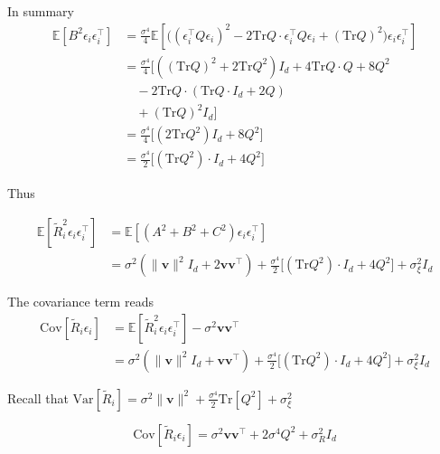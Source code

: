     
    In summary
    \begin{align*}
    \mathbb{E}[B^{2}\epsilon_{i}\epsilon_{i}^{\top}] & =\frac{\sigma^{4}}{4}\mathbb{E}[\Big((\epsilon_{i}^{\top}Q\epsilon_{i})^{2}-2\mathrm{Tr}Q\cdot\epsilon_{i}^{\top}Q\epsilon_{i}+(\mathrm{Tr}Q)^{2}\Big)\epsilon_{i}\epsilon_{i}^{\top}]\\
     & =\frac{\sigma^{4}}{4}\Big[((\mathrm{Tr}Q)^{2}+2\mathrm{Tr}Q^{2})I_{d}+4\mathrm{Tr}Q\cdot Q+8Q^{2}\\
     & \quad-2\mathrm{Tr}Q\cdot(\mathrm{Tr}Q\cdot I_{d}+2Q)\\
     & \quad+(\mathrm{Tr}Q)^{2}I_{d}\Big]\\
     & =\frac{\sigma^{4}}{4}\Big[(2\mathrm{Tr}Q^{2})I_{d}+8Q^{2}\Big]\\
     & =\frac{\sigma^{4}}{2}\Big[(\mathrm{Tr}Q^{2})\cdot I_{d}+4Q^{2}\Big]
    \end{align*}
    
    Thus
    
    \begin{align*}
    \mathbb{E}[\tilde{R}_{i}^{2}\epsilon_{i}\epsilon_{i}^{\top}] & =\mathbb{E}[(A^{2}+B^{2}+C^{2})\epsilon_{i}\epsilon_{i}^{\top}]\\
     & =\sigma^{2}(\|\mathbf{v}\|^{2}I_{d}+2\mathbf{v}\mathbf{v}^{\top})+\frac{\sigma^{4}}{2}\Big[(\mathrm{Tr}Q^{2})\cdot I_{d}+4Q^{2}\Big]+\sigma_{\xi}^{2}I_{d}
    \end{align*}
    
    The covariance term reads 
    \begin{align*}
    \mathrm{Cov}[\tilde{R}_{i}\epsilon_{i}] & =\mathbb{E}[\tilde{R}_{i}^{2}\epsilon_{i}\epsilon_{i}^{\top}]-\sigma^{2}\mathbf{v}\mathbf{v}^{\top}\\
     & =\sigma^{2}(\|\mathbf{v}\|^{2}I_{d}+\mathbf{v}\mathbf{v}^{\top})+\frac{\sigma^{4}}{2}\Big[(\mathrm{Tr}Q^{2})\cdot I_{d}+4Q^{2}\Big]+\sigma_{\xi}^{2}I_{d}
    \end{align*}
    
    Recall that $\mathrm{Var}[\tilde{R}_{i}]=\sigma^{2}\|\mathbf{v}\|^{2}+\frac{\sigma^{4}}{2}\mathrm{Tr}[Q^{2}]+\sigma_{\xi}^{2}$
    
    \[
    \mathrm{Cov}[\tilde{R}_{i}\epsilon_{i}]=\sigma^{2}\mathbf{v}\mathbf{v}^{\top}+2\sigma^{4}Q^{2}+\sigma_{R}^{2}I_{d}
    \]
    
